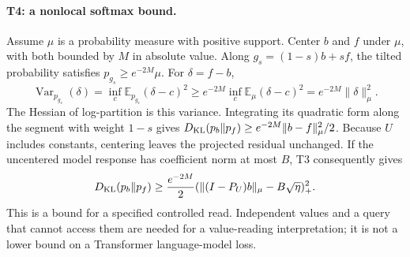 \paragraph{T4: a nonlocal softmax bound.}
Assume $\mu$ is a probability measure with positive support. Center $b$ and
$f$ under $\mu$, with both bounded by $M$ in absolute value. Along
$g_s=(1-s)b+sf$, the tilted probability satisfies $p_{g_s}\ge e^{-2M}\mu$.
For $\delta=f-b$,
\begin{equation}
\operatorname{Var}_{p_{g_s}}(\delta)
=\inf_c\mathbb E_{p_{g_s}}(\delta-c)^2
\ge e^{-2M}\inf_c\mathbb E_\mu(\delta-c)^2
=e^{-2M}\|\delta\|_\mu^2.
\end{equation}
The Hessian of log-partition is this variance. Integrating its quadratic form
along the segment with weight $1-s$ gives
$D_{\rm KL}(p_b\Vert p_f)\ge e^{-2M}\|b-f\|_\mu^2/2$.
Because $U$ includes constants, centering leaves the projected residual
unchanged. If the uncentered model response has coefficient norm at most $B$,
T3 consequently gives
\begin{equation}
D_{\rm KL}(p_b\Vert p_f)\ge\frac{e^{-2M}}2
(\|(I-P_U)b\|_\mu-B\sqrt\eta)_+^2.
\end{equation}
This is a bound for a specified controlled read. Independent values and a query
that cannot access them are needed for a value-reading interpretation; it is
not a lower bound on a Transformer language-model loss.
